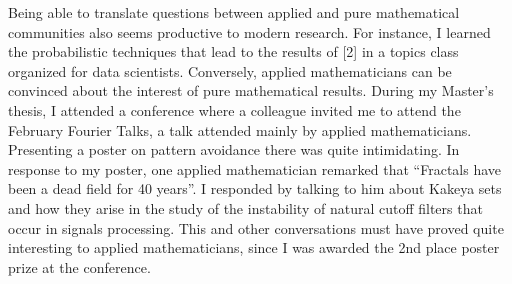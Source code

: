 \documentclass[12pt]{article}
\theoremstyle{plain}
\theoremstyle{remark}
\theoremstyle{definition}
\begin{document}
Being able to translate questions between applied and pure mathematical communities also seems productive to modern research. For instance, I learned the probabilistic techniques that lead to the results of [2] in a topics class organized for data scientists. Conversely, applied mathematicians can be convinced about the interest of pure mathematical results. During my Master's thesis, I attended a conference where a colleague invited me to attend the February Fourier Talks, a talk attended mainly by applied mathematicians. Presenting a poster on pattern avoidance there was quite intimidating. %
In response to my poster, one applied mathematician remarked that ``Fractals have been a dead field for 40 years''. I responded by talking to him about Kakeya sets and how they arise in the study of the instability of natural cutoff filters that occur in signals processing. This and other conversations must have proved quite interesting to applied mathematicians, since I was awarded the 2nd place poster prize at the conference.
\end{document}

